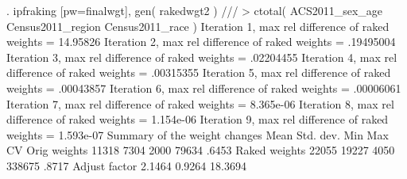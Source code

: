 . ipfraking [pw=finalwgt], gen( rakedwgt2 ) ///
>     ctotal( ACS2011_sex_age Census2011_region Census2011_race ) 
{\smallskip}
 Iteration 1, max rel difference of raked weights = 14.95826
 Iteration 2, max rel difference of raked weights = .19495004
 Iteration 3, max rel difference of raked weights = .02204455
 Iteration 4, max rel difference of raked weights = .00315355
 Iteration 5, max rel difference of raked weights = .00043857
 Iteration 6, max rel difference of raked weights = .00006061
 Iteration 7, max rel difference of raked weights = 8.365e-06
 Iteration 8, max rel difference of raked weights = 1.154e-06
 Iteration 9, max rel difference of raked weights = 1.593e-07
{\smallskip}
   Summary of the weight changes
{\smallskip}
              {\VBAR}    Mean    Std. dev.    Min        Max       CV
Orig weights  {\VBAR}    11318       7304      2000       79634   .6453
Raked weights {\VBAR}    22055      19227      4050      338675   .8717
Adjust factor {\VBAR}   2.1464               0.9264     18.3694
{\smallskip}
